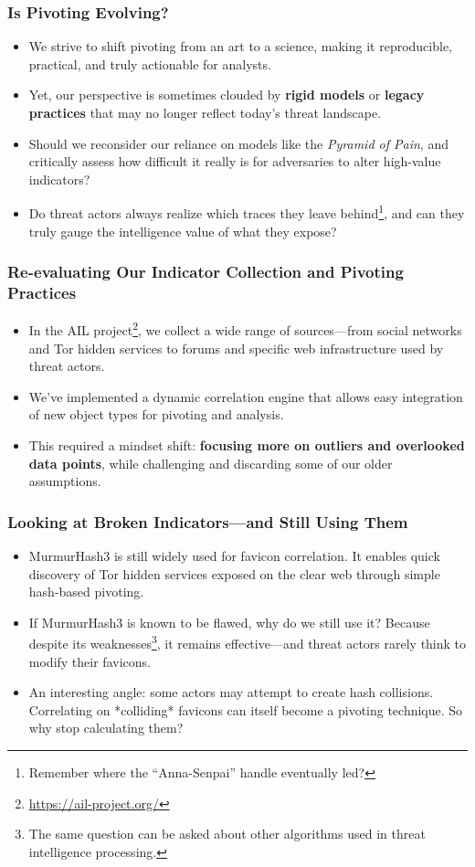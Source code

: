 \documentclass[10pt,aspectratio=169, colorlinks=true, linkcolor=circlBlue]{beamer}
\begin{document}
\begin{frame}
    \frametitle{Is Pivoting Evolving?}
    \begin{itemize}
        \item We strive to shift pivoting from an art to a science, making it reproducible, practical, and truly actionable for analysts.
	\item Yet, our perspective is sometimes clouded by {\bf rigid models} or {\bf legacy practices} that may no longer reflect today’s threat landscape.
        \item Should we reconsider our reliance on models like the \textit{Pyramid of Pain}, and critically assess how difficult it really is for adversaries to alter high-value indicators?
        \item Do threat actors always realize which traces they leave behind\footnote{Remember where the ``Anna-Senpai'' handle eventually led?}, and can they truly gauge the intelligence value of what they expose?
    \end{itemize}
\end{frame}

\begin{frame}
    \frametitle{Re-evaluating Our Indicator Collection and Pivoting Practices}
    \begin{itemize}
        \item In the AIL project\footnote{\url{https://ail-project.org/}}, we collect a wide range of sources—from social networks and Tor hidden services to forums and specific web infrastructure used by threat actors.
        \item We’ve implemented a dynamic correlation engine that allows easy integration of new object types for pivoting and analysis.
	\item This required a mindset shift: {\bf focusing more on outliers and overlooked data points}, while challenging and discarding some of our older assumptions.
    \end{itemize}
\end{frame}

\begin{frame}
    \frametitle{Looking at Broken Indicators—and Still Using Them}

    \begin{itemize}
        \item MurmurHash3 is still widely used for favicon correlation. It enables quick discovery of Tor hidden services exposed on the clear web through simple hash-based pivoting.
	\item If MurmurHash3 is known to be flawed, why do we still use it? Because despite its weaknesses\footnote{The same question can be asked about other algorithms used in threat intelligence processing.}, it remains effective—and threat actors rarely think to modify their favicons.
        \item An interesting angle: some actors may attempt to create hash collisions. Correlating on *colliding* favicons can itself become a pivoting technique. So why stop calculating them?
    \end{itemize}
\end{frame}
\end{document}
